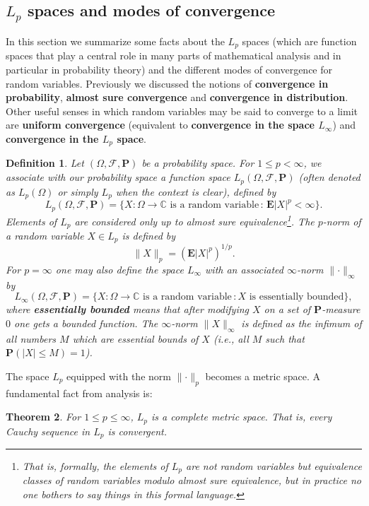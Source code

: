 \documentclass[12pt]{article}
\newtheorem{thm}{Theorem}[section]
\newtheorem{defi}[thm]{Definition}
\newcommand{\prob}{\mathbf{P}}
\newcommand{\expec}{\mathbf{E}}
\theoremstyle{example}
\begin{document}
\subsection{$L_p$ spaces and modes of convergence}

In this section we summarize some facts about the $L_p$ spaces (which are function spaces that play a central role in many parts of mathematical analysis and in particular in probability theory) and the different modes of convergence for random variables. Previously we discussed the notions of \textbf{convergence in probability}, \textbf{almost sure convergence} and \textbf{convergence in distribution}. Other useful senses in which random variables may be said to converge to a limit are \textbf{uniform convergence} (equivalent to \textbf{convergence in the space $L_\infty$}) and \textbf{convergence in the $L_p$ space}.

\begin{defi}
Let $(\Omega, \mathcal{F}, \prob)$ be a probability space. For $1\le p<\infty$, we associate with our probability space a function space
$L_p(\Omega, \mathcal{F}, \prob)$ (often denoted as $L_p(\Omega)$ or simply $L_p$ when the context is clear), defined by
$$ L_p(\Omega, \mathcal{F}, \prob) = \{ X:\Omega\to\mathbb{C}\textrm{ is a random variable}\,:\, \expec|X|^p < \infty \}. $$
Elements of $L_p$ are considered only up to almost sure equivalence\footnote{That is, formally, the elements of $L_p$ are not random variables but equivalence classes of random variables modulo almost sure equivalence, but in practice no one bothers to say things in this formal language.}.
The $p$-norm of a random variable $X\in L_p$ is defined by
$$ \lVert X\rVert_p = \left( \expec |X|^p\right)^{1/p}. $$
For $p=\infty$ one may also define the space $L_\infty$ with an associated $\infty$-norm $\lVert\cdot\rVert_\infty$ by
$$ L_\infty(\Omega,\mathcal{F},\prob) = \{ X:\Omega\to\mathbb{C}\textrm{ is a random variable}\,: X\textrm{ is essentially bounded} \}, $$
where \textbf{essentially bounded} means that after modifying $X$ on a set of $\prob$-measure $0$ one gets a bounded function. The $\infty$-norm $\lVert X\rVert_\infty$ is defined as the infimum of all numbers $M$ which are essential bounds of $X$ (i.e., all $M$ such that $\prob(|X|\le M)=1$).
\end{defi}

The space $L_p$ equipped with the norm $\lVert \cdot \rVert_p$ becomes a metric space. A fundamental fact from analysis is:

\begin{thm}
For $1\le p\le \infty$, $L_p$ is a complete metric space. That is, every Cauchy sequence in $L_p$ is convergent.
\end{thm}
\end{document}
